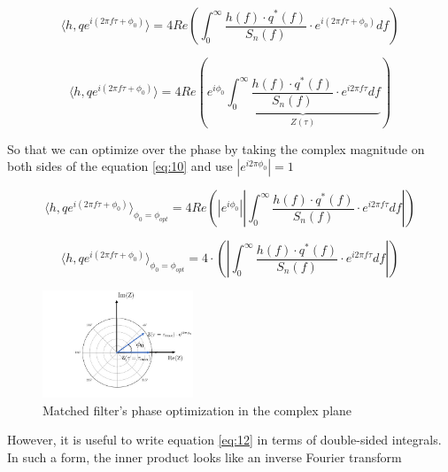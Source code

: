 \begin{equation}\label{eq:9}
\langle h,q e^{i(2\pi f \tau + \phi_0)} \rangle =4 Re\left( \int_{0}^{\infty} \frac{h(f) \cdot q^{*}(f) }{S_n(f)} \cdot e^{i(2\pi f \tau + \phi_0)} df \right)
\end{equation}

\begin{equation}\label{eq:10}
\langle h,q e^{i(2\pi f \tau + \phi_0)} \rangle =4 Re\left( e^{i \phi_0}\underbrace{\int_{0}^{\infty} \frac{h(f) \cdot q^{*}(f) }{S_n(f)} \cdot e^{i 2\pi f \tau} df}_{Z(\tau)} \right)
\end{equation}


So that we can optimize over the phase by taking the complex magnitude on both sides of the equation \ref{eq:10} and use $\left|e^{i2\pi \phi_0}\right|=1$

\begin{equation}\label{eq:11}
\langle h,q e^{i(2\pi f \tau + \phi_0)} \rangle_{\phi_0=\phi_{opt}} =4 Re\left( \left|e^{i \phi_0}\right|  \left| \int_{0}^{\infty} \frac{h(f) \cdot q^{*}(f) }{S_n(f)} \cdot e^{i 2\pi f \tau} df \right| \right)
\end{equation}

\begin{equation}\label{eq:12}
\langle h,q e^{i(2\pi f \tau + \phi_0)} \rangle_{\phi_0=\phi_{opt}} =4\cdot \left( \left| \int_{0}^{\infty} \frac{h(f) \cdot q^{*}(f) }{S_n(f)} \cdot e^{i 2\pi f \tau} df \right| \right)
\end{equation}

\begin{figure}[hbt!]

\begin{center}

\includegraphics[width=0.4\textwidth, angle=0]{images/ph_opt.png}
\caption{Matched filter's phase optimization in the complex plane}
\label{fig:6}
\end{center}
\end{figure}

\FloatBarrier

However, it is useful to write equation \ref{eq:12} in terms of double-sided integrals. In such a form, the inner product looks like an inverse Fourier transform

